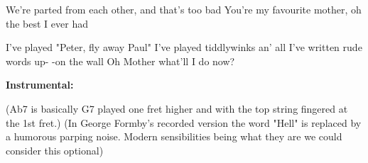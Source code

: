 We're parted from each other, and that's too bad
You're my favourite mother, oh the best I ever had

I've played "Peter, fly away 
Paul"
I've played tiddlywinks an' all
I've written rude words up- -on the wall
Oh Mother what'll I do now?

\textbf{Instrumental:}

{\small (Ab7 is basically G7 played one fret higher and with the top string
fingered at the 1st fret.)}
{\tiny (In George Formby's recorded version the word "Hell" is replaced
by a humorous parping noise. Modern sensibilities being what they are we could
consider this optional)}
